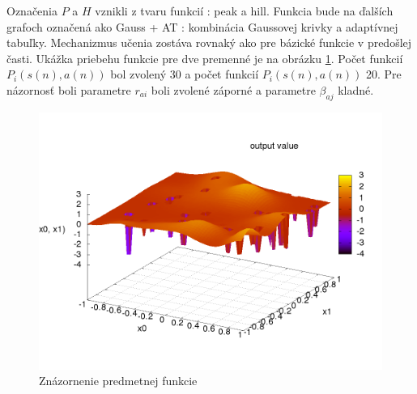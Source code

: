 Označenia $P$ a $H$ vznikli z tvaru funkcií : peak a hill. Funkcia bude na ďalších
grafoch označená ako Gauss + AT : kombinácia Gaussovej krivky a adaptívnej tabuľky.
Mechanizmus učenia zostáva rovnaký ako pre bázické funkcie v predošlej časti. Ukážka
priebehu funkcie pre dve premenné je na obrázku \ref{img:peak_hill_funcion}.
Počet funkcií $P_i(s(n), a(n))$ bol zvolený 30 a počet funkcií $P_i(s(n), a(n))$ 20.
Pre názornosť boli parametre $r_{ai}$ boli zvolené záporné a parametre $\beta_{aj}$ kladné.

\begin{figure}[]
\center
\includegraphics[scale=.5]{../pictures/peak_hill_function.png}
\caption{Znázornenie predmetnej funkcie}
\label{img:peak_hill_funcion}
\end{figure}
